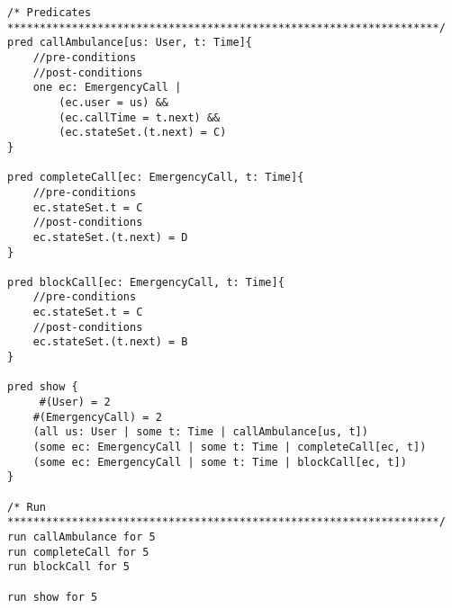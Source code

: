 \begin{lstlisting}
/* Predicates
*******************************************************************/
pred callAmbulance[us: User, t: Time]{
	//pre-conditions
	//post-conditions
	one ec: EmergencyCall |
		(ec.user = us) &&
		(ec.callTime = t.next) &&
		(ec.stateSet.(t.next) = C)
}

pred completeCall[ec: EmergencyCall, t: Time]{
	//pre-conditions
	ec.stateSet.t = C
	//post-conditions
	ec.stateSet.(t.next) = D
}

pred blockCall[ec: EmergencyCall, t: Time]{
	//pre-conditions
	ec.stateSet.t = C
	//post-conditions
	ec.stateSet.(t.next) = B
}

pred show {
	 #(User) = 2
	#(EmergencyCall) = 2
	(all us: User | some t: Time | callAmbulance[us, t])
	(some ec: EmergencyCall | some t: Time | completeCall[ec, t])
	(some ec: EmergencyCall | some t: Time | blockCall[ec, t])
}

/* Run
*******************************************************************/
run callAmbulance for 5
run completeCall for 5
run blockCall for 5

run show for 5


\end{lstlisting}